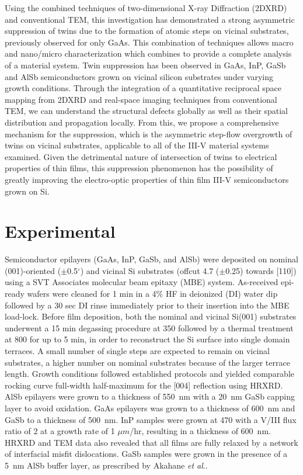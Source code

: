 Using the combined techniques of two-dimensional X-ray Diffraction (2DXRD) and conventional TEM, this investigation has demonstrated a strong asymmetric suppression of twins due to the formation of atomic steps on vicinal substrates, previously observed for only GaAs\cite{Wei1994,Xie1990,Rajkumar1990}. This combination of techniques allows macro and nano/micro characterization which combines to provide a complete analysis of a material system. Twin suppression has been observed in GaAs, InP, GaSb and AlSb semiconductors grown on vicinal silicon substrates under varying growth conditions. Through the integration of a quantitative reciprocal space mapping from 2DXRD and real-space imaging techniques from conventional TEM, we can understand the structural defects globally as well as their spatial distribution and propagation locally. From this, we propose a comprehensive mechanism for the suppression, which is the asymmetric step-flow overgrowth of twins on vicinal substrates, applicable to all of the III-V material systems examined. Given the detrimental nature of intersection of twins to electrical properties of thin films, this suppression phenomenon has the possibility of greatly improving the electro-optic properties of thin film III-V semiconductors grown on Si.
\section{Experimental}
Semiconductor epilayers (GaAs, InP, GaSb, and AlSb) were deposited on nominal (001)-oriented ($\pm$0.5$^\circ$) and vicinal Si substrates (offcut 4.7\degree{} ($\pm$0.25\degree) towards [110]) using a SVT Associates molecular beam epitaxy (MBE) system. As-received epi-ready wafers were cleaned for 1 min in a 4\% HF in deionized (DI) water dip followed by a 30 sec DI rinse immediately prior to their insertion into the MBE load-lock. Before film deposition, both the nominal and vicinal Si(001) substrates underwent a 15 min degassing procedure at 350\celsius{} followed by a thermal treatment at 800\celsius{} for up to 5 min, in order to reconstruct the Si surface into single domain terraces\cite{NeergaardWaltenburg1995,S1991,Sakamoto1986,Pehlke1991}. A small number of single steps are expected to remain on vicinal substrates, a higher number on nominal substrates because of the larger terrace length. Growth conditions followed established protocols\cite{Akahane2004,Balakrishnan2006a,Fischer1986} and yielded comparable rocking curve full-width half-maximum for the [004] reflection using HRXRD. AlSb epilayers were grown to a thickness of 550~nm with a 20~nm GaSb capping layer to avoid oxidation. GaAs epilayers was grown to a thickness of 600~nm and GaSb to a thickness of 500~nm. InP samples were grown at 470\celsius{} with a V/III flux ratio of 2 at a growth rate of 1 $\mu m$/hr, resulting in a thickness of 600~nm. HRXRD and TEM data also revealed that all films are fully relaxed by a network of interfacial misfit dislocations\cite{Vajargah2011}. GaSb samples were grown in the presence of a 5~nm AlSb buffer layer, as prescribed by Akahane \textit{et al}.\cite{Akahane2004}.

